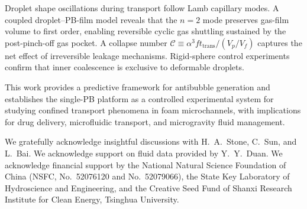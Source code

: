 \documentclass[%
 preprint,
 superscriptaddress,
 amsmath,amssymb,
 aps, prl,
]{revtex4-2}
\begin{document}
Droplet shape oscillations during transport follow Lamb capillary modes. A coupled droplet--PB-film model reveals that the $n=2$ mode preserves gas-film volume to first order, enabling reversible cyclic gas shuttling sustained by the post-pinch-off gas pocket. A collapse number $\mathcal{C} \equiv \alpha^3 f t_{\text{trans}}/(V_p/V_f)$ captures the net effect of irreversible leakage mechanisms. Rigid-sphere control experiments confirm that inner coalescence is exclusive to deformable droplets.\par

This work provides a predictive framework for antibubble generation and establishes the single-PB platform as a controlled experimental system for studying confined transport phenomena in foam microchannels, with implications for drug delivery, microfluidic transport, and microgravity fluid management.\par

\begin{acknowledgments}
We gratefully acknowledge insightful discussions with H.~A.~Stone, C.~Sun, and L.~Bai. We acknowledge support on fluid data provided by Y.~Y.~Duan. We acknowledge financial support by the National Natural Science Foundation of China (NSFC, No.~52076120 and No.~52079066), the State Key Laboratory of Hydroscience and Engineering, and the Creative Seed Fund of Shanxi Research Institute for Clean Energy, Tsinghua University.
\end{acknowledgments}


\end{document}
